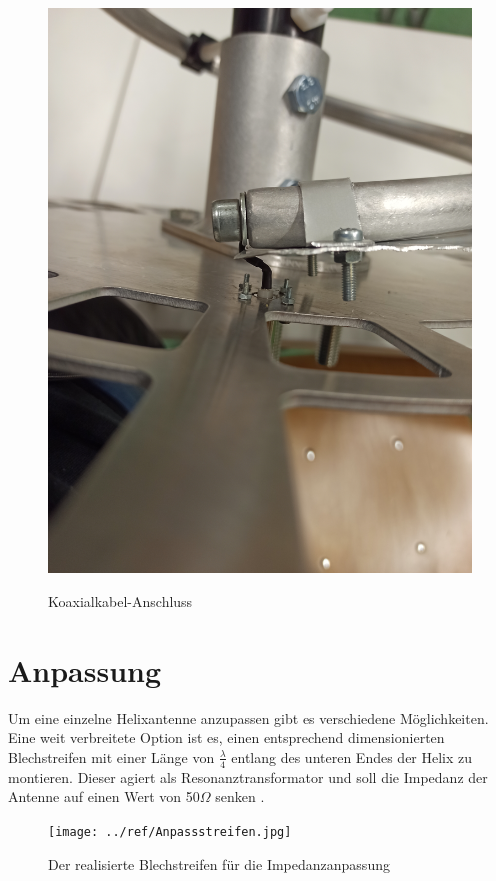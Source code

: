 \begin{figure}[h!]
\begin{minipage}[b]{.4\linewidth}
		\includegraphics[angle=270]{../ref/Befestigung-Innenleiter.jpg}
		\label{fig:Innenleiter-Befestigung}
	\end{minipage}
	\caption{Koaxialkabel-Anschluss}
\end{figure}



\section{Anpassung}
Um eine einzelne Helixantenne anzupassen gibt es verschiedene Möglichkeiten. Eine weit verbreitete Option ist es, einen entsprechend dimensionierten Blechstreifen mit einer Länge von $\frac{\lambda}{4}$ entlang des unteren Endes der Helix zu montieren. Dieser agiert als Resonanztransformator und soll die Impedanz der Antenne auf einen Wert von 50$\Omega$ senken \cite{kgwadi_parametric_2014}.

\begin{figure}[H]
	\centering
	\texttt{[image: ../ref/Anpassstreifen.jpg]}
	\caption{Der realisierte Blechstreifen für die Impedanzanpassung}
	\label{fig:matching-strip}
\end{figure}

